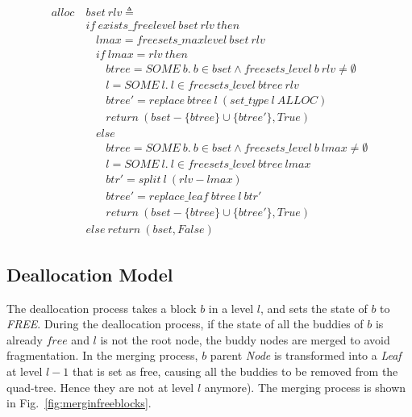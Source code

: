 \begin{definition} 
\end{definition}
\vspace{-7pt}
{\footnotesize
\begin{align*}
alloc\ &bset\ rlv \triangleq \\
&if\ exists\_freelevel\ bset\ rlv\ then \\
&\ \ \ \ lmax = freesets\_maxlevel\ bset\ rlv \\
&\ \ \ \ if\ lmax = rlv\ then \\
&\ \ \ \ \ \ \ \ btree = SOME\ b.\ b \in bset \wedge freesets\_level\ b\ rlv \ne \emptyset \\
&\ \ \ \ \ \ \ \ l = SOME\ l.\ l \in freesets\_level\ btree\ rlv \\
&\ \ \ \ \ \ \ \ btree' = replace\ btree\ l\ (set\_type\ l\ ALLOC) \\
&\ \ \ \ \ \ \ \ return\ (bset - \lbrace btree \rbrace \cup \lbrace btree' \rbrace, True) \\
&\ \ \ \ else \\
&\ \ \ \ \ \ \ \ btree = SOME\ b.\ b \in bset \wedge freesets\_level\ b\ lmax \ne \emptyset \\
&\ \ \ \ \ \ \ \ l = SOME\ l.\ l \in freesets\_level\ btree\ lmax \\
&\ \ \ \ \ \ \ \ btr' = split\ l\ (rlv - lmax) \\
&\ \ \ \ \ \ \ \ btree' = replace\_leaf\ btree\ l\ btr' \\
&\ \ \ \ \ \ \ \ return\ (bset - \lbrace btree \rbrace \cup \lbrace btree' \rbrace, True) \\
&else\ return\ (bset, False)
\end{align*}
}
\vspace{-17pt}

\subsection{Deallocation Model}

The deallocation process takes a block $b$ in a level $l$, and sets the state of $b$ to \emph{FREE}. During the deallocation process, if the state of all the buddies of $b$ is already $free$ and $l$ is not the root node, the buddy nodes are merged to avoid fragmentation. In the merging process, $b$ parent \emph{Node} is transformed into a \emph{Leaf} at level $l-1$ that is set as free, causing all the buddies to be removed from the quad-tree. Hence they are not at level $l$ anymore). The merging process is shown in Fig.~\ref{fig:merginfreeblocks}.

